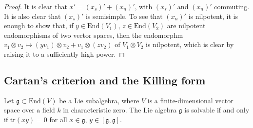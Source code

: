 \begin{proof}
 It is clear that $x'=(x_s)'+(x_n)'$, with $(x_s)'$ and $(x_n)'$ commuting. It is also clear that $(x_s)'$ is semisimple. To see that $(x_n)'$ is nilpotent, it is enough to show that, if $y\in \text{End}(V_1)$, $z\in \text{End}(V_2)$ are nilpotent endomorphisms of two vector spaces, then the endomorphm $v_1\otimes v_2\mapsto (yv_1) \otimes v_2 + v_1 \otimes (zv_2)$ of $V_1\otimes V_2$ is nilpotent, which is clear by raising it to a sufficiently high power.
\end{proof}





\subsection{Cartan's criterion and the Killing form}
\label{subsection-Cartan-criterion}

\begin{theorem}
\label{theorem-Cartans-criterion}
 Let $\mathfrak g\subset \text{End}(V)$ be a Lie subalgebra, where $V$ is a finite-dimensional vector space over a field $k$ in characteristic zero. The Lie algebra $\mathfrak g$ is solvable if and only if $\text{tr}(xy)=0$ for all $x\in \mathfrak g$, $y\in [\mathfrak g, \mathfrak g]$.
 \end{theorem}

